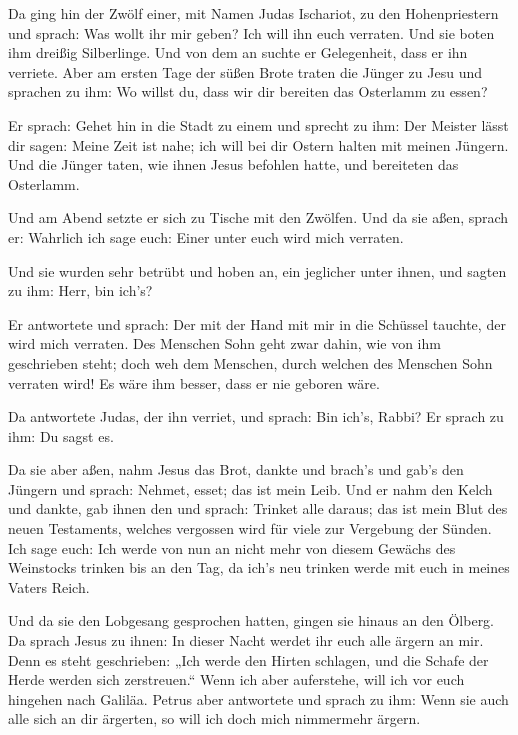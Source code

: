  Da ging hin der Zwölf einer, mit Namen Judas Ischariot,
zu den Hohenpriestern  und sprach: Was wollt ihr mir
geben? Ich will ihn euch verraten. Und sie boten ihm dreißig
Silberlinge.  Und von dem an suchte er Gelegenheit, dass
er ihn verriete.  Aber am ersten Tage der süßen Brote
traten die Jünger zu Jesu und sprachen zu ihm: Wo willst du, dass wir
dir bereiten das Osterlamm zu essen?

 Er sprach: Gehet hin in die Stadt zu einem und sprecht
zu ihm: Der Meister lässt dir sagen: Meine Zeit ist nahe; ich will bei
dir Ostern halten mit meinen Jüngern.  Und die Jünger
taten, wie ihnen Jesus befohlen hatte, und bereiteten das Osterlamm.

 Und am Abend setzte er sich zu Tische mit den Zwölfen.
 Und da sie aßen, sprach er: Wahrlich ich sage euch:
Einer unter euch wird mich verraten.

 Und sie wurden sehr betrübt und hoben an, ein jeglicher
unter ihnen, und sagten zu ihm: Herr, bin ich's?

 Er antwortete und sprach: Der mit der Hand mit mir in
die Schüssel tauchte, der wird mich verraten.  Des
Menschen Sohn geht zwar dahin, wie von ihm geschrieben steht; doch weh
dem Menschen, durch welchen des Menschen Sohn verraten wird! Es wäre ihm
besser, dass er nie geboren wäre.

 Da antwortete Judas, der ihn verriet, und sprach: Bin
ich's, Rabbi? Er sprach zu ihm: Du sagst es.

 Da sie aber aßen, nahm Jesus das Brot, dankte und
brach's und gab's den Jüngern und sprach: Nehmet, esset; das ist mein
Leib.  Und er nahm den Kelch und dankte, gab ihnen den
und sprach: Trinket alle daraus;  das ist mein Blut des
neuen Testaments, welches vergossen wird für viele zur Vergebung der
Sünden.  Ich sage euch: Ich werde von nun an nicht mehr
von diesem Gewächs des Weinstocks trinken bis an den Tag, da ich's neu
trinken werde mit euch in meines Vaters Reich.

 Und da sie den Lobgesang gesprochen hatten, gingen sie
hinaus an den Ölberg.  Da sprach Jesus zu ihnen: In
dieser Nacht werdet ihr euch alle ärgern an mir. Denn es steht
geschrieben: „Ich werde den Hirten schlagen, und die Schafe der Herde
werden sich zerstreuen.``  Wenn ich aber auferstehe, will
ich vor euch hingehen nach Galiläa.  Petrus aber
antwortete und sprach zu ihm: Wenn sie auch alle sich an dir ärgerten,
so will ich doch mich nimmermehr ärgern.

